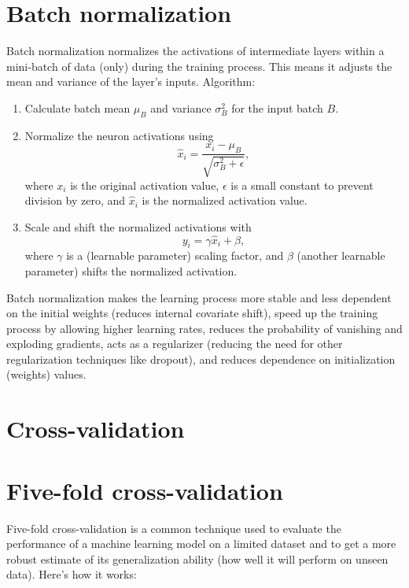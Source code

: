 \section{Batch normalization}
Batch normalization normalizes the activations of intermediate layers
within a mini-batch of data (only) during the training process. This
means it adjusts the mean and variance of the layer's
inputs. Algorithm:
\begin{enumerate}
\item Calculate batch mean $\mu_B$ and variance $\sigma^2_B$ for the input batch $B$.
\item Normalize the neuron activations using
  \begin{equation}
    \hat{x}_i = \frac{x_i-\mu_B}{\sqrt{\sigma^2_B+\epsilon}},
  \end{equation}
  where $x_i$ is the original  activation value, $\epsilon$ is a small
  constant  to  prevent  division  by zero,  and  $\hat{x}_i$  is  the
  normalized activation value.
\item Scale and shift the normalized activations with
  \begin{equation}
    y_i = \gamma\hat{x}_i+\beta,
  \end{equation}
  where $\gamma$ is a (learnable parameter) scaling factor, and
  $\beta$ (another learnable parameter) shifts the normalized
  activation.
\end{enumerate}

Batch normalization makes the learning process more stable and less
dependent on the initial weights (reduces internal covariate shift),
speed up the training process by allowing higher learning rates,
reduces the probability of vanishing and exploding gradients, acts as
a regularizer (reducing the need for other regularization techniques
like dropout), and reduces dependence on initialization (weights)
values.

\section{Cross-validation}

\section{Five-fold cross-validation}
Five-fold cross-validation is a common technique used to evaluate the performance of a machine learning model on a limited dataset and to get a more robust estimate of its generalization ability (how well it will perform on unseen data). Here's how it works:

